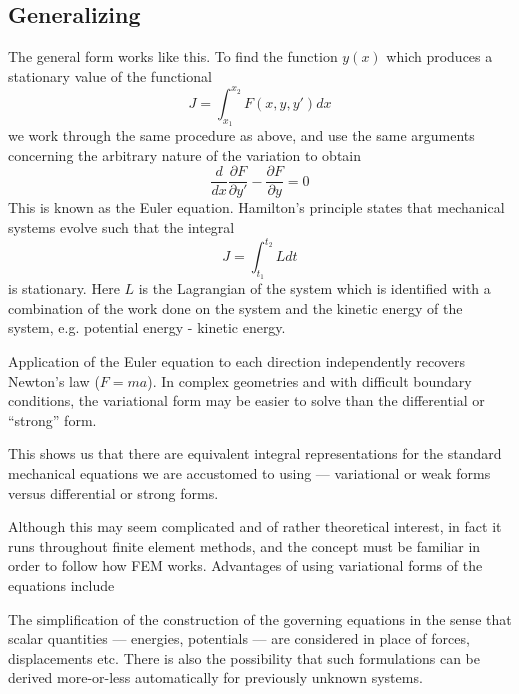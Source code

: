 \documentclass[10pt]{article}
\newcommand{\Red     }[1]{\textcolor[rgb]{0.7,0.0,0.0}{#1}}
\begin{document}
		\subsection{Generalizing}
		
		The general form works like this. To find the 
		function $y(x)$ which produces a stationary value of 
		the functional 
			\begin{equation}
				J=\int_{x_1}^{x_2} F(x,y,y') dx
			\end{equation}
		we work through the same procedure as above, and use the same
		arguments concerning the arbitrary nature of the variation to obtain
			\begin{equation}
				\frac{d}{dx}\frac{\partial F}{\partial y'} - \frac{\partial F}{\partial y} = 0
			\end{equation}
		This is known as the Euler equation.	
		Hamilton's principle states that mechanical systems evolve such that 
		the integral 
			\begin{equation}
				J=\int_{t_1}^{t_2} L dt
			\end{equation}
		is stationary. Here $L$ is the Lagrangian of the system which is
		identified with a combination of  the work done on the system and the kinetic energy 
		of the system, e.g. potential energy - kinetic energy.
		
		Application of the Euler equation to each direction independently
		recovers Newton's law ($F=ma$). In complex geometries and
		with difficult boundary conditions, the variational form
		may be easier to solve than the differential or ``strong'' form.
		
		\Red{This shows us that there are equivalent integral
		representations for the standard mechanical equations we
		are accustomed to using --- variational or weak forms
		versus differential or strong forms}.
		
		
		Although this may seem complicated and of rather theoretical interest, 
		in fact it runs throughout finite element
		methods, and the concept must be familiar in order to follow how FEM
		works.  
		Advantages of using variational forms of the equations include 
		
		
		The simplification of the construction of the governing
		equations in the sense that scalar quantities --- energies,
		potentials --- are considered in place of forces, displacements
		etc. There is also the possibility that such formulations can 
		be derived more-or-less automatically for previously unknown
		systems.
		
\end{document}
